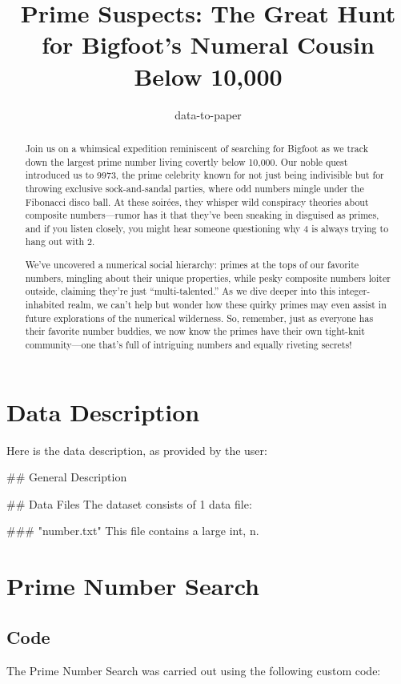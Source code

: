 \documentclass[11pt]{article}
\title{Prime Suspects: The Great Hunt for Bigfoot’s Numeral Cousin Below 10,000}
\author{data-to-paper}
\begin{document}
\maketitle
\begin{abstract}
Join us on a whimsical expedition reminiscent of searching for Bigfoot as we track down the largest prime number living covertly below 10,000. Our noble quest introduced us to 9973, the prime celebrity known for not just being indivisible but for throwing exclusive sock-and-sandal parties, where odd numbers mingle under the Fibonacci disco ball. At these soirées, they whisper wild conspiracy theories about composite numbers—rumor has it that they’ve been sneaking in disguised as primes, and if you listen closely, you might hear someone questioning why 4 is always trying to hang out with 2. 

We’ve uncovered a numerical social hierarchy: primes at the tops of our favorite numbers, mingling about their unique properties, while pesky composite numbers loiter outside, claiming they’re just “multi-talented.” As we dive deeper into this integer-inhabited realm, we can't help but wonder how these quirky primes may even assist in future explorations of the numerical wilderness. So, remember, just as everyone has their favorite number buddies, we now know the primes have their own tight-knit community—one that’s full of intriguing numbers and equally riveting secrets!
\end{abstract}

\clearpage
\appendix

\section{Data Description}
Here is the data description, as provided by the user:

\begin{codeoutput}
## General Description

## Data Files
The dataset consists of 1 data file:

### "number.txt"
This file contains a large int, n.


\end{codeoutput}

\section{Prime Number Search}
\subsection{{Code}}
The Prime Number Search was carried out using the following custom code:
\end{document}
